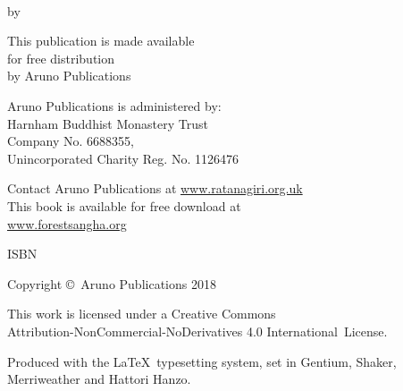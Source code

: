 \cleartoverso
\thispagestyle{empty}

{\copyrightsize
\raggedright
\setlength{\parindent}{0pt}%
\setlength{\parskip}{0.8\baselineskip}%

\thetitle\\
by \theauthor

This publication is made available\\
for free distribution\\
by Aruno Publications

Aruno Publications is administered by:\\
Harnham Buddhist Monastery Trust\\
Company No. 6688355,\\
Unincorporated Charity Reg. No. 1126476

Contact Aruno Publications at \href{https://ratanagiri.org.uk/}{www.ratanagiri.org.uk}\\
This book is available for free download at\\
\href{https://forestsangha.org/}{www.forestsangha.org}

ISBN \theISBN

Copyright \copyright\ Aruno Publications 2018

\vfill

{\footnotesize

This work is licensed under a Creative Commons\\
Attribution-NonCommercial-NoDerivatives 4.0 International~License.

Produced with the \LaTeX\ typesetting system, set in Gentium, Shaker,\\
Merriweather and Hattori Hanzo.

\theEditionInfo

}}
